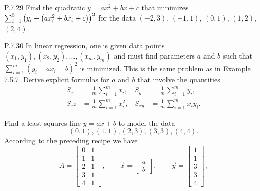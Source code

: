 \documentclass{../homework}
\begin{document}
\begin{problems}
\begin{enumerate}
    \begin{solution}

    \end{solution}
  \end{enumerate}

\item[P.7.29] Find the quadratic \(y = ax^2 + bx + c\) that minimizes
  \(\sum_{i=1}^5 \left( {y_i - \left( {a x_i^2 + b x_i + c} \right)} \right)^2\) for the
  data \((-2, 3)\), \((-1, 1)\), \((0, 1)\), \((1, 2)\), \((2, 4)\).

  \begin{solution}

  \end{solution}

\item[P.7.30] In linear regression, one is given data points
  \((x_1, y_1), (x_2, y_2), \dots, (x_m, y_m)\) and must find
  parameters \(a\) and \(b\) such that
  \(\sum_{i=1}^m (y_i - ax_i - b)^2\) is minimized.  This is the same
  problem as in Example 7.5.7.  Derive explicit formulas for \(a\) and
  \(b\) that involve the quantities
  \begin{align*}
    S_x     &= \frac 1 m \sum_{i=1}^m x_i,   &
    S_y     &= \frac 1 m \sum_{i=1}^m y_i,   \\
    S_{x^2} &= \frac 1 m \sum_{i=1}^m x_i^2, &
    S_{xy}  &= \frac 1 m \sum_{i=1}^m x_i y_i.
  \end{align*}
  \begin{bookexample}[7.5.7]
    Find a least squares line \(y = ax+b\) to model the data
    \[
      (0, 1), (1, 1), (2, 3), (3, 3), (4, 4).
    \]
    According to the preceding recipe we have
    \[
      A =
      \begin{bmatrix}
        0 & 1 \\
        1 & 1 \\
        2 & 1 \\
        3 & 1 \\
        4 & 1
      \end{bmatrix},
      \qquad
      \vec x =
      \begin{bmatrix}
        a \\ b
      \end{bmatrix},
      \qquad
      \vec y =
      \begin{bmatrix}
        1 \\ 1 \\ 3 \\ 3 \\ 4
      \end{bmatrix},
\]
\end{bookexample}
\end{problems}
\end{document}
